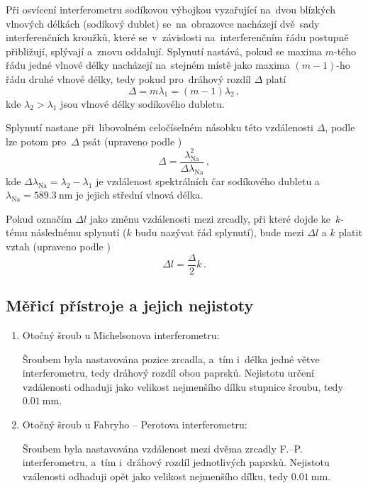 \documentclass{../concepts/titul_protokol_p/prepareprotokol} %
\begin{document}
Při osvícení interferometru sodíkovou výbojkou vyzařující na~dvou blízkých vlnových délkách (sodíkový dublet)
se~na~obrazovce nacházejí dvě~sady interferenčních kroužků, které se~v~závislosti na~interferenčním řádu postupně
přibližují, splývají a~znovu oddalují. Splynutí nastává, pokud se maxima $m$-tého řádu jedné vlnové délky
nacházejí na~stejném místě jako maxima $(m-1)$-ho řádu druhé vlnové délky, tedy pokud pro~dráhový rozdíl
$\Delta$ platí \cite{pokyny}
\begin{equation}\label{eq:Delta}
    \Delta = m \lambda_1 = (m-1) \lambda_2 \,,
\end{equation}
kde $\lambda_2 > \lambda_1$ jsou vlnové délky sodíkového dubletu.

Splynutí nastane při~libovolném celočíselném násobku této vzdálenosti $\Delta$,
podle \cite{pokyny} lze potom pro~$\Delta$ psát (upraveno podle \cite{pokyny})
\begin{equation}\label{eq:fabryperot}
    \Delta = \frac{\lambda_\mathrm{Na}^2}{\Delta \lambda_{\mathrm{Na}}} \,,
\end{equation}
kde $\Delta \lambda_{\mathrm{Na}} = \lambda_2 - \lambda_1$ je vzdálenost spektrálních čar sodíkového dubletu
a~$\lambda_{\mathrm{Na}} = \qty{589.3}{\nm}$ \cite{pokyny3} je jejich střední vlnová délka.

Pokud označím $\Delta l$ jako změnu vzdálenosti mezi zrcadly, při které dojde ke~$k$-tému následnému splynutí
($k$ budu nazývat řád splynutí), bude mezi $\Delta l$ a $k$ platit vztah (upraveno podle \cite{pokyny})
\begin{equation}\label{eq:deltal}
    \Delta l = \frac{\Delta}{2} k \,.
\end{equation}


\subsection{Měřicí přístroje a jejich nejistoty}
\begin{enumerate}
    \item Otočný šroub u Michelsonova interferometru:
    
    Šroubem byla nastavována pozice zrcadla, a~tím i~délka jedné větve interferometru, tedy dráhový rozdíl obou
    paprsků. Nejistotu určení
    vzdálenosti odhaduji jako velikost nejmenšího dílku stupnice šroubu, tedy $\qty{0.01}{\mm}$.

    \item Otočný šroub u Fabryho -- Perotova interferometru:
    
    Šroubem byla nastavována vzdálenost mezi dvěma zrcadly F.--P. interferometru, a~tím i~dráhový rozdíl
    jednotlivých paprsků. Nejistotu vzálenosti odhaduji opět jako velikost nejmenšího dílku, tedy
    $\qty{0.01}{\mm}$.

\end{enumerate}
\end{document}
